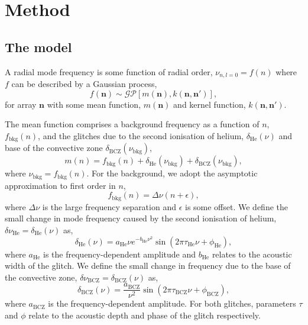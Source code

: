 \documentclass[linenumbers,modern,astrosymb,times]{aastex631}
\newcommand{\helium}{\mathrm{He}}
\newcommand{\bcz}{\mathrm{BCZ}}
\newcommand{\bkg}{\mathrm{bkg}}
\begin{document}
\section{Method}\label{sec:method}


\subsection{The model}\label{sec:model}

A radial mode frequency is some function of radial order,
\(\nu_{n,l=0} = f(n)\) where \(f\) can be described by a Gaussian process,
%
\begin{equation}
    f(\bm n) \sim \mathcal{GP}\left[m(\bm n), k(\bm n, \bm n')\right],
\end{equation}
%
for array \(\bm n\) with some mean function, \(m(\bm n)\) and kernel function,
\(k(\bm n, \bm n')\).

The mean function comprises a background frequency as a function of \(n\),
\(f_\bkg(n)\), and the glitches due to the second ionisation of helium,
\(\delta_\helium(\nu)\) and base of the convective zone
\(\delta_\bcz(\nu_\bkg)\),
%
\begin{equation}
    m(n) = f_\bkg(n) + \delta_\helium(\nu_\bkg) +
    \delta_\bcz(\nu_\bkg),
\end{equation}
%
where \(\nu_\bkg = f_\bkg(n)\). For the background, we adopt the
asymptotic approximation to first order in \(n\),
%
\begin{equation}
    f_\bkg(n) = \Delta\nu (n + \epsilon),
\end{equation}
%
where \(\Delta\nu\) is the large frequency separation and \(\epsilon\) is some
offset. We define the small change in mode frequency caused by the second
ionisation of helium, \(\delta\nu_\helium = \delta_\helium(\nu)\) as,
%
\begin{equation}
    \delta_\helium(\nu) = a_\helium \nu e^{- b_\helium \nu^2}
    \sin\left( 2 \pi \tau_\helium \nu + \phi_\helium \right),
\end{equation}
%
where \(a_\helium\) is the frequency-dependent amplitude and \(b_\helium\)
relates to the acoustic width of the glitch. We define the small change in
frequency due to the base of the convective zone,
\(\delta\nu_\bcz = \delta_\bcz(\nu)\) as,
%
\begin{equation}
    \delta_\bcz(\nu) = \frac{a_\bcz}{\nu^2}
    \sin\left( 2 \pi \tau_\bcz \nu + \phi_\bcz \right),
\end{equation}
%
where \(a_\bcz\) is the frequency-dependent amplitude. For both glitches,
parameters \(\tau\) and \(\phi\) relate to the acoustic depth and phase of
the glitch respectively.
\end{document}
